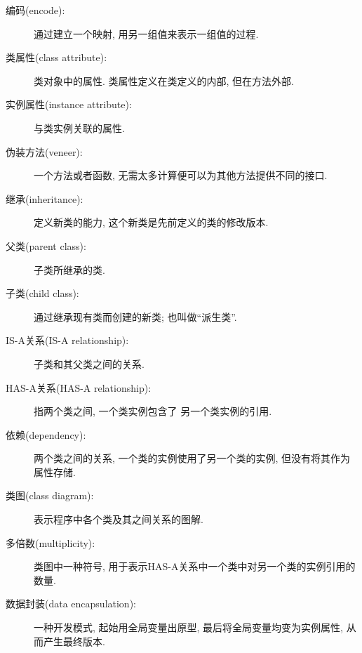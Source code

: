\documentclass[10pt]{book}
\begin{document}
\begin{description}

\item[编码(encode):] 通过建立一个映射, 用另一组值来表示一组值的过程.

\item[类属性(class attribute):] 类对象中的属性. 类属性定义在类定义的内部, 
但在方法外部. 

\item[实例属性(instance attribute):] 与类实例关联的属性.

\item[伪装方法(veneer):] 一个方法或者函数, 无需太多计算便可以为其他方法提供不同的接口. 

\item[继承(inheritance):] 定义新类的能力, 这个新类是先前定义的类的修改版本. 

\item[父类(parent class):] 子类所继承的类.

\item[子类(child class):] 通过继承现有类而创建的新类; 也叫做``派生类''. 

\item[IS-A关系(IS-A relationship):] 子类和其父类之间的关系.

\item[HAS-A关系(HAS-A relationship):] 指两个类之间, 一个类实例包含了
另一个类实例的引用.

\item[依赖(dependency):] 两个类之间的关系, 
一个类的实例使用了另一个类的实例, 但没有将其作为属性存储. 

\item[类图(class diagram):] 表示程序中各个类及其之间关系的图解. 

\item[多倍数(multiplicity):] 类图中一种符号, 
用于表示HAS-A关系中一个类中对另一个类的实例引用的数量. 

\item[数据封装(data encapsulation):] 一种开发模式, 
起始用全局变量出原型, 最后将全局变量均变为实例属性, 从而产生最终版本. 

\end{description}
\end{document}
